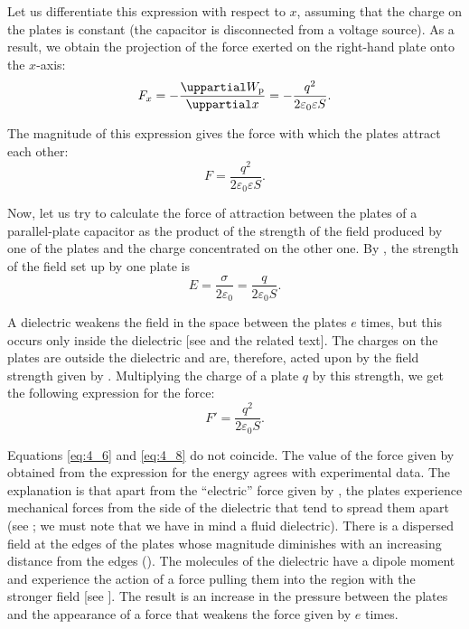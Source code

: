 \noindent
Let us differentiate this expression with respect to $x$, assuming that the charge on the plates is constant (the capacitor is disconnected from a voltage source). As a result, we obtain the projection of the force exerted on the right-hand plate onto the $x$-axis:
\begin{equation*}
	F_x = - \diffpartial{\ab{W}{p}}{x} = - \frac{q^2}{2 \varepsilon_0 \varepsilon S}.
\end{equation*}

\noindent
The magnitude of this expression gives the force with which the plates attract each other:
\begin{equation}\label{eq:4_6}
	F = \frac{q^2}{2 \varepsilon_0 \varepsilon S}.
\end{equation}

Now, let us try to calculate the force of attraction between the plates of a parallel-plate capacitor as the product of the strength of the field produced by one of the plates and the charge concentrated on the other one. By , the strength of the field set up by one plate is
\begin{equation}\label{eq:4_7}
	E = \frac{\sigma}{2 \varepsilon_0} = \frac{q}{2 \varepsilon_0 S}.
\end{equation}

\noindent
A dielectric weakens the field in the space between the plates $e$ times, but this occurs only inside the dielectric [see  and the related text]. The charges on the plates are outside the dielectric and are, therefore, acted upon by the field strength given by . Multiplying the charge of a plate $q$ by this strength, we get the following expression for the force:
\begin{equation}\label{eq:4_8}
	F' = \frac{q^2}{2 \varepsilon_0 S}.
\end{equation}

Equations \eqref{eq:4_6} and \eqref{eq:4_8} do not coincide. The value of the force given by  obtained from the expression for the energy agrees with experimental data. The explanation is that apart from the ``electric'' force given by , the plates experience mechanical forces from the side of the dielectric that tend to spread them apart (see ; we must note that we have in mind a fluid dielectric). There is a dispersed field at the edges of the plates whose magnitude diminishes with an increasing distance from the edges (). The molecules of the dielectric have a dipole moment and experience the action of a force pulling them into the region with the stronger field [see ]. The result is an increase in the pressure between the plates and the appearance of a force that weakens the force given by  $e$ times.

